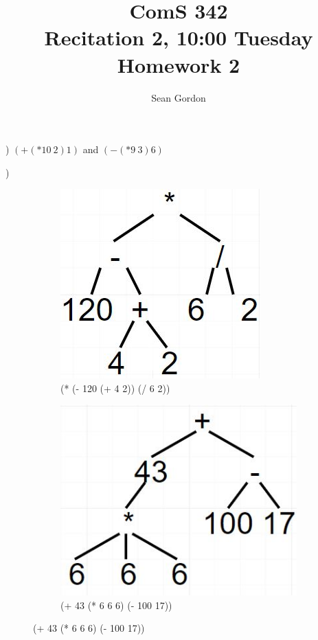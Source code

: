 \documentclass[12pt]{article}
\title{ComS 342\\Recitation 2, 10:00 Tuesday\\Homework 2}
\author{Sean Gordon}
\begin{document}
\maketitle


) $(+ (* 10\ 2) 1)$ and $(- (* 9\ 3) 6)$

)


\begin{figure}[h!]
  \centering
  \begin{subfigure}[b]{0.4\linewidth}
    \includegraphics[width=\linewidth]{ComS342_HW2_2a.jpg}
    \caption{(* (- 120 (+ 4 2)) (/ 6 2))}
  \end{subfigure}
  \begin{subfigure}[b]{0.4\linewidth}
    \includegraphics[width=\linewidth]{ComS342_HW2_2b.jpg}
    \caption{(+ 43 (* 6 6 6) (- 100 17))}
  \end{subfigure}
  \label{fig:Pt2}
\end{figure}
\end{document}
